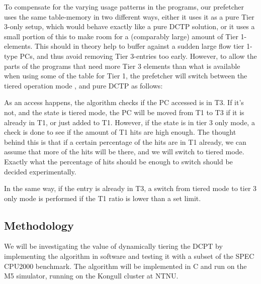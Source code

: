 To compensate for the varying usage patterns in the programs, our prefetcher uses the same
table-memory in two different ways, either it uses it as a pure Tier 3-only setup, which
would behave exactly like a pure DCTP solution, or it uses a small portion of this to make
room for a (comparably large) amount of Tier 1-elements. This should in theory help to buffer
against a sudden large flow tier 1-type PCs, and thus avoid removing Tier 3-entries too early.
However, to allow the parts of the programs that need more Tier 3 elements than what is available
when using some of the table for Tier 1, the prefetcher will switch between the tiered operation mode
, and pure DCTP as follows:

As an access happens, the algorithm checks if the PC accessed is in T3. If it's
not, and the state is tiered mode, the PC will be moved from T1 to T3 if it is
already in T1, or just added to T1. However, if the state is in tier 3 only
mode, a check is done to see if the amount of T1 hits are high enough. The
thought behind this is that if a certain percentage of the hits are in T1
already, we can assume that more of the hits will be there, and we will switch
to tiered mode. Exactly what the percentage of hits should be enough to
switch should be decided experimentally.

In the same way, if the entry is already in T3, a switch from tiered mode to
tier 3 only mode is performed if the T1 ratio is lower than a set limit.


\subsection{Methodology}

We will be investigating the value of dynamically tiering the DCPT by
implementing the algorithm in software and testing it with a subset of the SPEC
CPU2000 benchmark.  The algorithm will be implemented in C and run on the M5
simulator, running on the Kongull cluster at NTNU.
